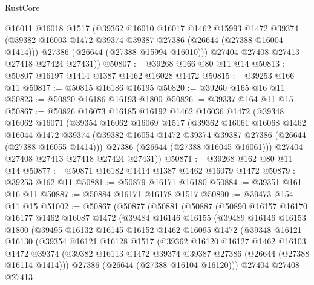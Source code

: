 \begin{lexlean}{RustCore}
\begin{coremodule}
        @16011
        @16018
        @1517
        (@39362
          @16010
          @16017
          @1462
          @15993
          @1472
          @39374
          (@39382 @16003 @1472 @39374 @39387 @27386 (@26644 (@27388 @16004 @1414)))
          @27386
          (@26644 (@27388 @15994 @16010)))
        @27404
        @27408
        @27413
        @27418
        @27424
        @27431))
@50807 := @39268 @166 @80 @11 @14
@50813 := @50807 @16197 @1414 @1387 @1462 @16028 @1472
@50815 := @39253 @166 @11
@50817 := @50815 @16186 @16195
@50820 := @39260 @165 @16 @11
@50823 := @50820 @16186 @16193 @1800
@50826 := @39337 @164 @11 @15
@50867 := @50826
    @16073
    @16185
    @16192
    @1462
    @16036
    @1472
    (@39348
      @16062
      @16071
      (@39354
        @16062
        @16069
        @1517
        (@39362
          @16061
          @16068
          @1462
          @16044
          @1472
          @39374
          (@39382 @16054 @1472 @39374 @39387 @27386 (@26644 (@27388 @16055 @1414)))
          @27386
          (@26644 (@27388 @16045 @16061)))
        @27404
        @27408
        @27413
        @27418
        @27424
        @27431))
@50871 := @39268 @162 @80 @11 @14
@50877 := @50871 @16182 @1414 @1387 @1462 @16079 @1472
@50879 := @39253 @162 @11
@50881 := @50879 @16171 @16180
@50884 := @39351 @161 @16 @11
@50887 := @50884 @16171 @16178 @1517
@50890 := @39473 @154 @11 @15
@51002 := @50867
    (@50877
      (@50881
        (@50887
          (@50890
            @16157
            @16170
            @16177
            @1462
            @16087
            @1472
            (@39484
              @16146
              @16155
              (@39489
                @16146
                @16153
                @1800
                (@39495
                  @16132
                  @16145
                  @16152
                  @1462
                  @16095
                  @1472
                  (@39348
                    @16121
                    @16130
                    (@39354
                      @16121
                      @16128
                      @1517
                      (@39362
                        @16120
                        @16127
                        @1462
                        @16103
                        @1472
                        @39374
                        (@39382 @16113 @1472 @39374 @39387 @27386 (@26644 (@27388 @16114 @1414)))
                        @27386
                        (@26644 (@27388 @16104 @16120)))
                      @27404
                      @27408
                      @27413

\end{coremodule}
\end{lexlean}
